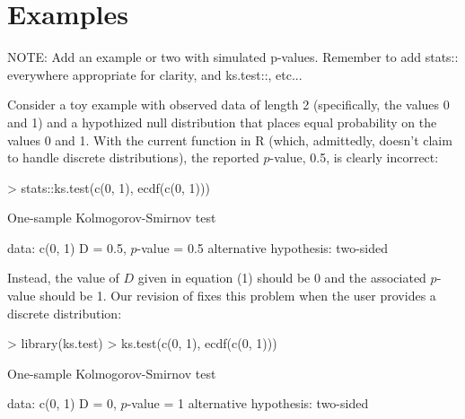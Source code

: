 \section{Examples}

NOTE: Add an example or two with simulated p-values.  Remember to add
stats:: everywhere appropriate for clarity, and ks.test::, etc...

Consider a toy example with observed data of length 2 (specifically, the
values 0 and 1) and a hypothized null distribution that places equal
probability on the values 0 and 1.  With the current  function
in R (which, admittedly, doesn't claim to handle discrete distributions),
the reported $p$-value, 0.5, is clearly incorrect:
\begin{Schunk}
\begin{Sinput}
> stats::ks.test(c(0, 1), ecdf(c(0, 1)))
\end{Sinput}
\begin{Soutput}
	One-sample Kolmogorov-Smirnov test

data:  c(0, 1) 
D = 0.5, $p$-value = 0.5
alternative hypothesis: two-sided 
\end{Soutput}
\end{Schunk}
Instead, the value of $D$ given in equation (1)
should be 0 and the associated $p$-value should be 1.  
Our revision of 
fixes this problem when the user provides a discrete distribution:
\begin{Schunk} 
\begin{Sinput}
> library(ks.test)
> ks.test(c(0, 1), ecdf(c(0, 1)))
\end{Sinput}
\begin{Soutput}
	One-sample Kolmogorov-Smirnov test

data:  c(0, 1) 
D = 0, $p$-value = 1
alternative hypothesis: two-sided 
\end{Soutput}
\end{Schunk}

